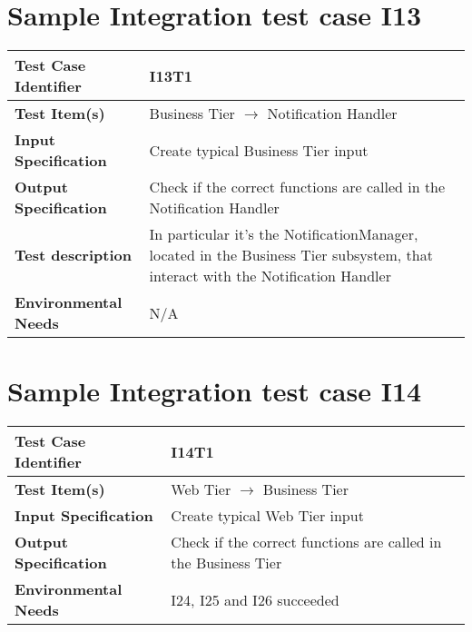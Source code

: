 \section{Sample Integration test case I13}\label{I13}
\begin{center}
	\vspace{0.6cm}
	\begin{tabular}{|l|l|}
		\hline
		\textbf{Test Case Identifier} & I13T1 \bigstrut \\\hline
		\textbf{Test Item(s)} & Business Tier \ensuremath{\rightarrow} Notification Handler \bigstrut \\\hline
		\textbf{Input Specification} & Create typical Business Tier input \bigstrut \\\hline
		\textbf{Output Specification} & Check if the correct functions are called in the Notification Handler \bigstrut \\\hline
		\textbf{Test description} & In particular it's the NotificationManager, located in the Business Tier subsystem, that interact with the Notification Handler \bigstrut \\\hline
		\textbf{Environmental Needs} & N/A \bigstrut \\\hline
	\end{tabular}
\end{center}

\section{Sample Integration test case I14}\label{I14}
\begin{center}
	\vspace{0.6cm}
	\begin{tabular}{|l|l|}
		\hline
		\textbf{Test Case Identifier} & I14T1 \bigstrut \\\hline
		\textbf{Test Item(s)} & Web Tier \ensuremath{\rightarrow} Business Tier \bigstrut \\\hline
		\textbf{Input Specification} & Create typical Web Tier input \bigstrut \\\hline
		\textbf{Output Specification} & Check if the correct functions are called in the Business Tier \bigstrut \\\hline
		\textbf{Environmental Needs} & I24, I25 and I26 succeeded \bigstrut \\\hline
	\end{tabular}
\end{center}

